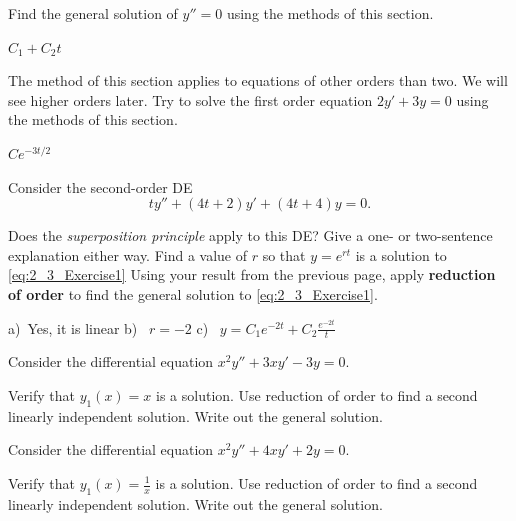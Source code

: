 \begin{exercise}
Find the general solution of $y'' = 0$ using the methods of this section.
\end{exercise}
\comboSol{%
}
{%
$C_1 + C_2t$
}

\begin{exercise}
The method of this section applies to equations of other orders than two.
We will see
higher orders later.  Try to solve the first order equation
$2y' + 3y = 0$ using the methods of this section.
\end{exercise}
\comboSol{%
}
{%
$Ce^{-3t/2}$
}

\begin{exercise}
Consider the second-order DE 
\begin{equation}
ty''+(4t+2)y'+(4t+4)y=0. \label{eq:2_3_Exercise1}
\end{equation}
\begin{tasks}
\task Does the {\it superposition principle} apply to this DE? Give a one- or two-sentence explanation either way.
\task Find a value of $r$ so that $y=e^{rt}$ is a solution to \eqref{eq:2_3_Exercise1}
\task Using your result from the previous page, apply {\bf reduction of order} to find the general solution to \eqref{eq:2_3_Exercise1}.
\end{tasks}
\end{exercise}
\comboSol{%
}
{%
a)~Yes, it is linear \quad b)~ $r=-2$ \quad c)~ $y = C_1e^{-2t} + C_2\frac{e^{-2t}}{t}$
}

\begin{exercise}\ansMark%
Consider the differential equation $x^2y'' + 3xy' - 3y = 0$.
\begin{tasks}
\task Verify that $y_1(x) = x$ is a solution.
\task Use reduction of order to find a second linearly independent solution.
\task Write out the general solution. 
\end{tasks}
\end{exercise}

\begin{exercise}\ansMark%
Consider the differential equation $x^2y'' + 4xy' + 2y = 0$.
\begin{tasks}
\task Verify that $y_1(x) = \frac{1}{x}$ is a solution.
\task Use reduction of order to find a second linearly independent solution.
\task Write out the general solution. 
\end{tasks}
\end{exercise}

